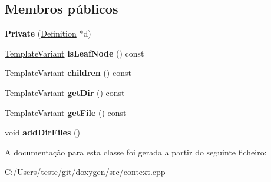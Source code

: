 \subsection*{Membros públicos}
\begin{DoxyCompactItemize}
\item 
\hypertarget{class_dir_file_node_context_1_1_private_a6529dcdd46dbed3f4721285f414b3632}{{\bfseries Private} (\hyperlink{class_definition}{Definition} $\ast$d)}\label{class_dir_file_node_context_1_1_private_a6529dcdd46dbed3f4721285f414b3632}

\item 
\hypertarget{class_dir_file_node_context_1_1_private_a294b828ee5cfccceb76c68a2a2c94965}{\hyperlink{class_template_variant}{Template\-Variant} {\bfseries is\-Leaf\-Node} () const }\label{class_dir_file_node_context_1_1_private_a294b828ee5cfccceb76c68a2a2c94965}

\item 
\hypertarget{class_dir_file_node_context_1_1_private_aca10906ad6f957c2696e917548979f46}{\hyperlink{class_template_variant}{Template\-Variant} {\bfseries children} () const }\label{class_dir_file_node_context_1_1_private_aca10906ad6f957c2696e917548979f46}

\item 
\hypertarget{class_dir_file_node_context_1_1_private_a00e38715f6639604e5e7707b16c52df3}{\hyperlink{class_template_variant}{Template\-Variant} {\bfseries get\-Dir} () const }\label{class_dir_file_node_context_1_1_private_a00e38715f6639604e5e7707b16c52df3}

\item 
\hypertarget{class_dir_file_node_context_1_1_private_afc30f2550e67d6a1686a7e4397b0efd0}{\hyperlink{class_template_variant}{Template\-Variant} {\bfseries get\-File} () const }\label{class_dir_file_node_context_1_1_private_afc30f2550e67d6a1686a7e4397b0efd0}

\item 
\hypertarget{class_dir_file_node_context_1_1_private_ad3c71e323f0240814f987c73d71880ef}{void {\bfseries add\-Dir\-Files} ()}\label{class_dir_file_node_context_1_1_private_ad3c71e323f0240814f987c73d71880ef}

\end{DoxyCompactItemize}


A documentação para esta classe foi gerada a partir do seguinte ficheiro\-:\begin{DoxyCompactItemize}
\item 
C\-:/\-Users/teste/git/doxygen/src/context.\-cpp\end{DoxyCompactItemize}
